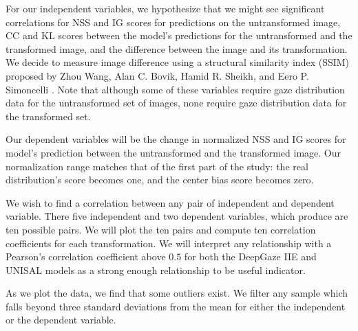 For our independent variables, we hypothesize that we might see significant correlations for NSS and IG scores for predictions on the untransformed image, CC and KL scores between the model's predictions for the untransformed and the transformed image, and the difference between the image and its transformation. We decide to measure image difference using a structural similarity index (SSIM) proposed by Zhou Wang, Alan C. Bovik, Hamid R. Sheikh, and Eero P. Simoncelli \cite{ssim}. Note that although some of these variables require gaze distribution data for the untransformed set of images, none require gaze distribution data for the transformed set.

Our dependent variables will be the change in normalized  NSS and IG scores for model's prediction between the untransformed and the transformed image. Our normalization range matches that of the first part of the study: the real distribution's score becomes one, and the center bias score becomes zero.

We wish to find a correlation between any pair of independent and dependent variable. There five independent and two dependent variables, which produce are ten possible pairs. We will plot the ten pairs and compute ten correlation coefficients for each transformation. We will interpret any relationship with a Pearson's correlation coefficient above $0.5$ for both the DeepGaze IIE and UNISAL models as a strong enough relationship to be useful indicator.

As we plot the data, we find that some outliers exist. We filter any sample which falls beyond three standard deviations from the mean for either the independent or the dependent variable.